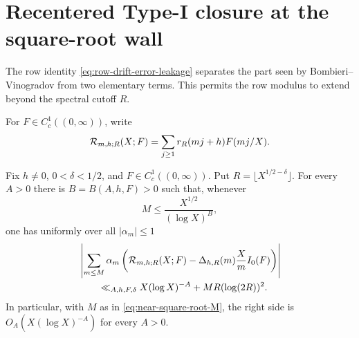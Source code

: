 \section{Recentered Type-I closure at the square-root wall}
\label{sec:recentered-typei}

The row identity \eqref{eq:row-drift-error-leakage} separates the part
seen by Bombieri--Vinogradov from two elementary terms.  This permits the
row modulus to extend beyond the spectral cutoff $R$.

For $F\in C_c^1((0,\infty))$, write
\begin{equation}
 \mathcal R_{m,h;R}(X;F)=
 \sum_{j\ge1}r_R(mj+h)F(mj/X).
 \label{eq:row-residual-definition}
\end{equation}

\begin{theorem}
\label{thm:recentered-TypeI}
Fix $h\ne0$, $0<\delta<1/2$, and
$F\in C_c^1((0,\infty))$.  Put
$R=\lfloor X^{1/2-\delta}\rfloor$.  For every $A>0$ there is
$B=B(A,h,F)>0$ such that, whenever
\begin{equation}
 M\le\frac{X^{1/2}}{(\log X)^B},
 \label{eq:BV-row-wall}
\end{equation}
one has uniformly over all $|\alpha_m|\le1$
\begin{align}
 &\left|
 \sum_{m\le M}\alpha_m
 \left(
 \mathcal R_{m,h;R}(X;F)
 -\Delta_{h,R}(m)\frac Xm I_0(F)
 \right)
 \right|
 \notag\\
 &\qquad\ll_{A,h,F,\delta}
 X(\log X)^{-A}+MR(\log(2R))^2.
 \label{eq:recentered-TypeI-bound}
\end{align}
In particular, with $M$ as in \eqref{eq:near-square-root-M}, the right
side is $O_A(X(\log X)^{-A})$ for every $A>0$.
\end{theorem}

